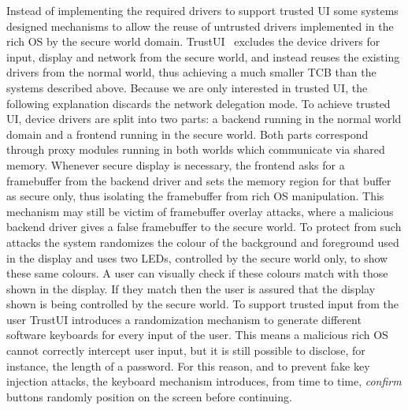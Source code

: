 Instead of implementing the required drivers to support trusted UI some systems designed mechanisms to allow the reuse of untrusted drivers implemented in the rich OS by the secure world domain. TrustUI~\cite{li2014building} excludes the device drivers for input, display and network from the secure world, and instead reuses the existing drivers from the normal world, thus achieving a much smaller TCB than the systems described above. Because we are only interested in trusted UI, the following explanation discards the network delegation mode. To achieve trusted UI, device drivers are split into two parts: a backend running in the normal world domain and a frontend running in the secure world. Both parts correspond through proxy modules running in both worlds which communicate via shared memory. Whenever secure display is necessary, the frontend asks for a framebuffer from the backend driver and sets the memory region for that buffer as secure only, thus isolating the framebuffer from rich OS manipulation. This mechanism may still be victim of framebuffer overlay attacks, where a malicious backend driver gives a false framebuffer to the secure world. To protect from such attacks the system randomizes the colour of the background and foreground used in the display and uses two LEDs, controlled by the secure world only, to show these same colours. A user can visually check if these colours match with those shown in the display. If they match then the user is assured that the display shown is being controlled by the secure world. To support trusted input from the user TrustUI introduces a randomization mechanism to generate different software keyboards for every input of the user. This means a malicious rich OS cannot correctly intercept user input, but it is still possible to disclose, for instance, the length of a password. For this reason, and to prevent fake key injection attacks, the keyboard mechanism introduces, from time to time, \emph{confirm} buttons randomly position on the screen before continuing. 

